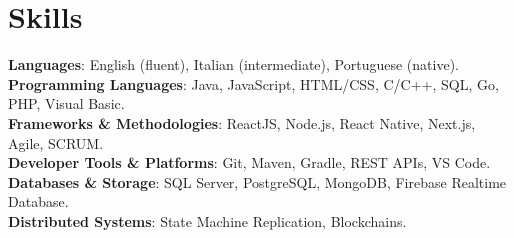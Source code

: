 \documentclass[letterpaper,11pt]{article}
\begin{document}
\section{Skills}
 \begin{itemize}[leftmargin=0.15in, label={}]
    \small{\item{
    \textbf{Languages}{: English (fluent), Italian (intermediate), Portuguese (native).} \\ \vspace{2mm}
     \textbf{Programming Languages}{: Java, JavaScript, HTML/CSS, C/C++, SQL, Go, PHP, Visual Basic.} \\ \vspace{2mm}
     \textbf{Frameworks \& Methodologies}{: ReactJS, Node.js, React Native, Next.js, Agile, SCRUM.} \\ \vspace{2mm}
     \textbf{Developer Tools \& Platforms}{: Git, Maven, Gradle, REST APIs, VS Code.} \\ \vspace{2mm}
     \textbf{Databases \& Storage}{: SQL Server, PostgreSQL, MongoDB, Firebase Realtime Database.} \\ \vspace{2mm}
     \textbf{Distributed Systems}{: State Machine Replication, Blockchains.} \\ \vspace{2mm}
    }}
 \end{itemize}


\end{document}
